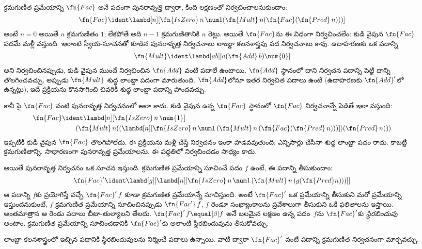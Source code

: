 \documentclass[../../../include/open-logic-section]{subfiles}
\begin{document}


క్రమగుణిత ప్రమేయాన్ని $\fn{Fac}$ అనే పదంగా పునరావృత్తి ద్వారా,
కింది లక్షణంతో నిర్వచించాలనుకుందాం:
\[
\fn{Fac} \ident \lambd[n][\fn{IsZero}\, n\, \num 1 (\fn{Mult}\, n (\fn{Fac}(\fn{Pred} \, n)))]
\]
అంటే $n = 0$ అయితే $n$ క్రమగుణితం $1$; లేకపోతే అది
$n-1$ క్రమగుణితానికి $n$ రెట్లు. అయితే $\fn{Fac}$ను ఈ విధంగా
నిర్వచించలేం: కుడి వైపున $\fn{Fac}$ పదమే మళ్లీ వస్తుంది.
ఇలాంటి స్వీయ-సూచనతో కూడిన పునరావృత్త నిర్వచనాలు
లాంబ్డా కలనశాస్త్రపు పద నిర్వచనాలు కావు. ఉదాహరణకు ఒక పదాన్ని
\[
\fn{Mult} \ident \lambd[ab][a (\fn{Add}\, b) \num{0}]
\]
అని నిర్వచించినప్పుడు, కుడి వైపున ముందే నిర్వచించిన
$\fn{Add}$ వంటి పదాలే ఉంటాయి.
$\fn{Add}$ స్థానంలో దాని నిర్వచన పదాన్ని పెట్టి దాన్ని
తొలగించవచ్చు. అప్పుడు $\fn{Mult}$ శుద్ధ లాంబ్డా పదంగా
మారుతుంది. $\fn{Add}$లోనూ ఇతర నిర్వచిత పదాలు ఉంటే
(ఉదాహరణకు $\fn{Add}'$లో ఉన్నట్లు), ఇదే ప్రక్రియను
కొనసాగించి చివరికి శుద్ధ లాంబ్డా పదాన్ని పొందవచ్చు.

కానీ పై $\fn{Fac}$ వంటి పునరావృత్త నిర్వచనంలో అలా కాదు.
కుడి వైపున ఉన్న $\fn{Fac}$ స్థానంలో $\fn{Fac}$ నిర్వచనాన్నే
పెడితే ఇలా వస్తుంది:
\begin{align*}
  \fn{Fac} & \ident \lambd[n][\fn{IsZero}\, n\, \num{1}] \\
    & \qquad (\fn{Mult}\, n
  ((\lambd[n][\fn{IsZero} \, n \, \num 1\, (\fn{Mult}\, n\, (\fn{Fac}
    (\fn{Pred}\, n)))]) (\fn{Pred}\, n)))
\end{align*}
ఇప్పటికీ కుడి వైపున $\fn{Fac}$ తొలగిపోలేదు. ఈ
ప్రక్రియను మళ్లీ చేస్తే నిర్వచనం ఇంకా పొడవవుతుంది;
ఎన్నిసార్లు చేసినా శుద్ధ లాంబ్డా పదం రాదు. కాబట్టి
క్రమగుణితాన్ని, సాధారణంగా పునరావృత్త ప్రమేయాలను,
ఈ పద్ధతిలో నిర్వచించడం సాధ్యం కాదు.

అయితే పునరావృత్త నిర్వచనం ఒక సూచన ఇస్తుంది. క్రమగుణిత
ప్రమేయాన్ని సూచించే పదం $f$ ఉంటే, ఈ పదాన్ని తీసుకుందాం:
\[
\fn{Fac}' \ident \lambd[g][\lambd[n][\fn{IsZero} \, n \, \num 1\, (\fn{Mult} \, n\, (g (\fn{Pred} n)))]]
\]
ఆ పదాన్ని $f$కు ప్రయోగిస్తే వచ్చే $\fn{Fac}'\,f$ కూడా
క్రమగుణిత ప్రమేయాన్నే సూచిస్తుంది. అంటే $\fn{Fac}'$ ఒక
ప్రమేయాన్ని తీసుకుని మరో ప్రమేయాన్ని ఇస్తుందనుకుంటే,
$f$ క్రమగుణిత ప్రమేయాన్ని సూచించినప్పుడు $\fn{Fac'}\, f$,
$f$ రెండూ సంఖ్యాంకాలను ప్రవేశాలుగా తీసుకుని ఒకే ఫలితాలను ఇస్తాయి.
అంతమాత్రాన ఆ రెండు పదాలు బీటా-తుల్యాలని తేలదు.
$\fn{Fac}' \, f \equal[\beta] f$ అనే బలమైన లక్షణం
ఉన్న పదం~$f$ను $\fn{Fac}'$కు \emph{స్థిరబిందువు} అంటాం.
క్రమగుణిత ప్రమేయాన్ని సూచించడానికి $\fn{Fac}'$కు అలాంటి స్థిరబిందువును తీసుకోవచ్చు.

లాంబ్డా కలనశాస్త్రంలో ఇచ్చిన పదానికి స్థిరబిందువులను
నిర్మించే పదాలు ఉన్నాయి. వాటి ద్వారా $\fn{Fac}'$ వంటి
పదాన్ని క్రమగుణిత నిర్వచనంగా మార్చవచ్చు.
\end{document}
